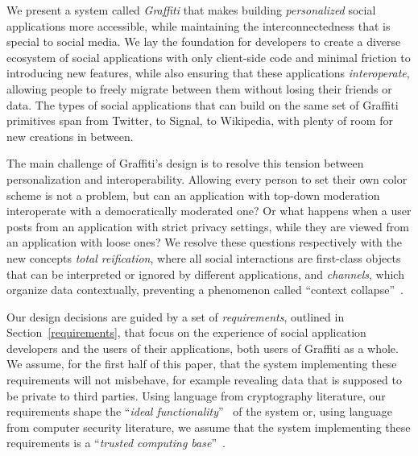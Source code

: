 We present a system called \emph{Graffiti} that makes
building \emph{personalized} social applications more accessible,
while maintaining the interconnectedness that is special to social media.
We lay the foundation for developers to create a diverse ecosystem
of social applications
with only client-side code and minimal friction
to introducing new features,
while also ensuring that these applications \emph{interoperate},
allowing people to freely migrate between them without
losing their friends or data.
The types of social applications that can build on the same set
of Graffiti primitives span from Twitter, to Signal, to Wikipedia,
with plenty of room for new creations in between.

The main challenge of Graffiti's design is to resolve
this tension between personalization and interoperability.
Allowing every person to set their own color scheme is
not a problem, but can an application with top-down
moderation interoperate with a democratically moderated one?
Or what happens when a user posts from an application with strict privacy settings,
while they are viewed from an application with loose ones?
We resolve these questions respectively with the
new concepts \emph{total reification},
where all social interactions are first-class objects that
can be interpreted or ignored by different applications,
and \emph{channels}, which organize data contextually,
preventing a phenomenon called ``context collapse''~\cite{contextcollapse}.



Our design decisions are guided by a set of \emph{requirements}, outlined
in Section~\ref{requirements}, that focus on the experience
of social application developers and the users of their applications,
both users of Graffiti as a whole.
We assume, for the first half of this paper, that the system implementing these requirements
will not misbehave, for example revealing data that is supposed to be private to third parties.
Using language from cryptography literature,
our requirements shape the
``\emph{ideal functionality}''~\cite{universallycomposable}
of the system or, using language from computer security literature,
we assume that the system implementing these requirements is a ``\emph{trusted computing base}''~\cite{tcb}.


